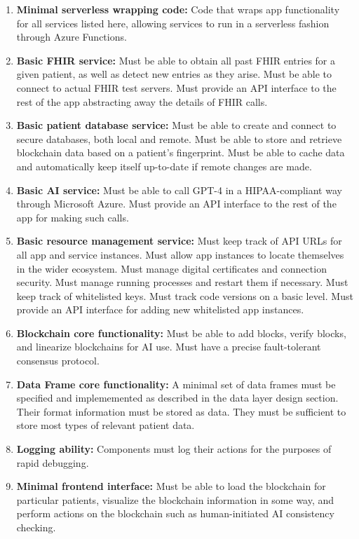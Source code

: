 \documentclass[12pt]{article}
\begin{document}
\begin{enumerate}
\item {\bf Minimal serverless wrapping code:} \label{module:serverless} Code that wraps app functionality for all services listed here, allowing services to run in a serverless fashion through Azure Functions.

\item {\bf Basic FHIR service:} \label{module:fhir} Must be able to obtain all past FHIR entries for a given patient, as well as detect new entries as they arise. Must be able to connect to actual FHIR test servers. Must provide an API interface to the rest of the app abstracting away the details of FHIR calls.

\item {\bf Basic patient database service:} \label{module:database} Must be able to create and connect to secure databases, both local and remote. Must be able to store and retrieve blockchain data based on a patient's fingerprint. Must be able to cache data and automatically keep itself up-to-date if remote changes are made.

\item {\bf Basic AI service:} \label{module:ai} Must be able to call GPT-4 in a HIPAA-compliant way through Microsoft Azure. Must provide an API interface to the rest of the app for making such calls.

\item {\bf Basic resource management service:} \label{module:management} Must keep track of API URLs for all app and service instances. Must allow app instances to locate themselves in the wider ecosystem. Must manage digital certificates and connection security. Must manage running processes and restart them if necessary. Must keep track of whitelisted keys. Must track code versions on a basic level. Must provide an API interface for adding new whitelisted app instances.

\item {\bf Blockchain core functionality:} \label{module:blockchain} Must be able to add blocks, verify blocks, and linearize blockchains for AI use. Must have a precise fault-tolerant consensus protocol.

\item {\bf Data Frame core functionality:} \label{module:data} A minimal set of data frames must be specified and implememented as described in the data layer design section. Their format information must be stored as data. They must be sufficient to store most types of relevant patient data.

\item {\bf Logging ability:} \label{module:logging} Components must log their actions for the purposes of rapid debugging.

\item {\bf Minimal frontend interface:} \label{module:frontend} Must be able to load the blockchain for particular patients, visualize the blockchain information in some way, and perform actions on the blockchain such as human-initiated AI consistency checking.
\end{enumerate}
\end{document}
